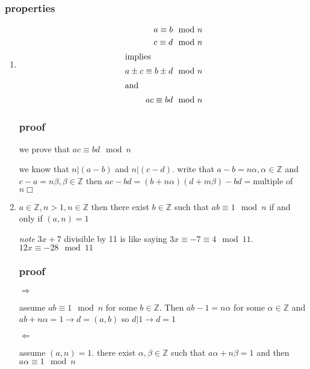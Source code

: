 \documentclass[letterpaper]{article}
\begin{document}
\subsubsection*{properties}
\begin{enumerate}
\item
\begin{align*}
  a\equiv b \mod n\\
  c\equiv d \mod n\\
  \intertext{implies}
  a\pm c\equiv b\pm d \mod n\\
  \intertext{and}
  ac\equiv bd \mod n\\
\end{align*}
\subsubsection*{proof}
we prove that $ac\equiv bd \mod n$

we know that $n|(a-b)$ and $n|(c-d)$. write that $a-b=n\alpha, \alpha\in\mathbb{Z}$ and $c-a=n\beta, \beta\in\mathbb{Z}$ then $ac-bd=(b+n\alpha)(d+m\beta)-bd=$multiple of $n \Box$

\item
$a\in\mathbb{Z}, n>1, n\in\mathbb{Z}$ then there exist $b\in\mathbb{Z}$ such that $ab\equiv 1 \mod n$ if and only if $(a,n)=1$ 

\emph{note} $3x+7$ divisible by 11 is like saying $3x\equiv -7\equiv4 \mod 11$. $12x\equiv-28 \mod 11$
\subsubsection*{proof}
$\Rightarrow$

assume $ab\equiv1\mod n$ for some $b\in\mathbb{Z}$. Then $ab-1=n\alpha$ for some $\alpha\in\mathbb{Z}$ and $ab+n\alpha=1\rightarrow d=(a,b)$ so $d|1\rightarrow d=1$ 

$\Leftarrow$

assume $(a,n)=1$. there exist $\alpha,\beta\in\mathbb{Z}$ such that $a\alpha+n\beta=1$ and then $a\alpha\equiv1\mod n$
\end{enumerate}
\end{document}
